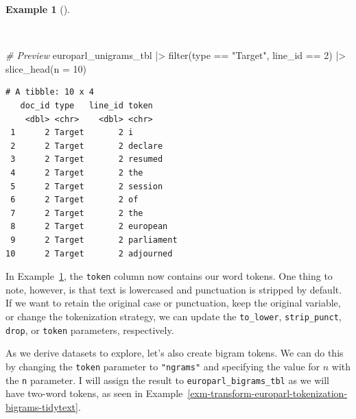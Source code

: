\documentclass[
  letterpaper,
  krantz1]{latex/krantz-mod}
\newenvironment{Shaded}{\begin{snugshade}}{\end{snugshade}}
\newcommand{\AttributeTok}[1]{\textcolor[rgb]{0.00,0.00,0.00}{#1}}
\newcommand{\CommentTok}[1]{\textcolor[rgb]{0.00,0.00,0.00}{\textit{#1}}}
\newcommand{\DecValTok}[1]{\textcolor[rgb]{0.00,0.00,0.00}{#1}}
\newcommand{\FunctionTok}[1]{\textcolor[rgb]{0.00,0.00,0.00}{#1}}
\newcommand{\NormalTok}[1]{\textcolor[rgb]{0.00,0.00,0.00}{#1}}
\newcommand{\SpecialCharTok}[1]{\textcolor[rgb]{0.00,0.00,0.00}{#1}}
\newcommand{\StringTok}[1]{\textcolor[rgb]{0.00,0.00,0.00}{#1}}
\theoremstyle{definition}
\newtheorem{example}{Example}[chapter]
\theoremstyle{definition}
\theoremstyle{remark}
\begin{document}
\begin{example}[]\protect\hypertarget{exm-transform-europarl-tokenization-words-preview}{}\label{exm-transform-europarl-tokenization-words-preview}

~

\begin{Shaded}
\begin{Highlighting}[numbers=left,,]
\CommentTok{\# Preview}
\NormalTok{europarl\_unigrams\_tbl }\SpecialCharTok{|\textgreater{}}
  \FunctionTok{filter}\NormalTok{(type }\SpecialCharTok{==} \StringTok{"Target"}\NormalTok{, line\_id }\SpecialCharTok{==} \DecValTok{2}\NormalTok{) }\SpecialCharTok{|\textgreater{}}
  \FunctionTok{slice\_head}\NormalTok{(}\AttributeTok{n =} \DecValTok{10}\NormalTok{)}
\end{Highlighting}
\end{Shaded}

\begin{verbatim}
# A tibble: 10 x 4
   doc_id type   line_id token     
    <dbl> <chr>    <dbl> <chr>     
 1      2 Target       2 i         
 2      2 Target       2 declare   
 3      2 Target       2 resumed   
 4      2 Target       2 the       
 5      2 Target       2 session   
 6      2 Target       2 of        
 7      2 Target       2 the       
 8      2 Target       2 european  
 9      2 Target       2 parliament
10      2 Target       2 adjourned 
\end{verbatim}

\end{example}

In Example~\ref{exm-transform-europarl-tokenization-words-preview}, the
\texttt{token} column now contains our word tokens. One thing to note,
however, is that text is lowercased and punctuation is stripped by
default. If we want to retain the original case or punctuation, keep the
original variable, or change the tokenization strategy, we can update
the \texttt{to\_lower}, \texttt{strip\_punct}, \texttt{drop}, or
\texttt{token} parameters, respectively.

As we derive datasets to explore, let's also create bigram tokens. We
can do this by changing the \texttt{token} parameter to
\texttt{"ngrams"} and specifying the value for \(n\) with the \texttt{n}
parameter. I will assign the result to \texttt{europarl\_bigrams\_tbl}
as we will have two-word tokens, as seen in
Example~\ref{exm-transform-europarl-tokenization-bigrams-tidytext}.
\end{document}

